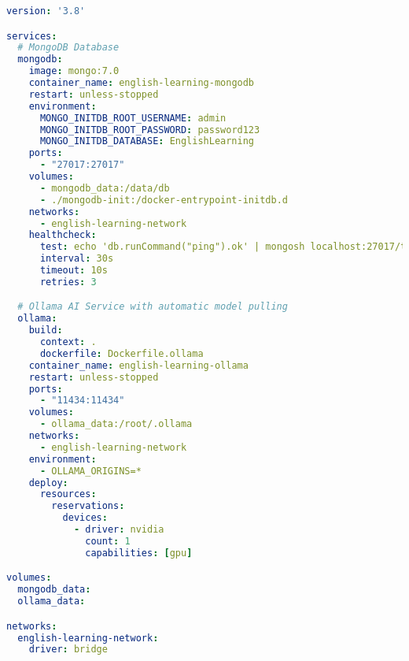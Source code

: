 \documentclass[12pt,a4paper]{article}
\begin{document}
\begin{lstlisting}[language=yaml, style=mystyle, caption=Configurazione Docker Compose - Orchestrazione Servizi, label=lst:dockercompose]
version: '3.8'

services:
  # MongoDB Database
  mongodb:
    image: mongo:7.0
    container_name: english-learning-mongodb
    restart: unless-stopped
    environment:
      MONGO_INITDB_ROOT_USERNAME: admin
      MONGO_INITDB_ROOT_PASSWORD: password123
      MONGO_INITDB_DATABASE: EnglishLearning
    ports:
      - "27017:27017"
    volumes:
      - mongodb_data:/data/db
      - ./mongodb-init:/docker-entrypoint-initdb.d
    networks:
      - english-learning-network
    healthcheck:
      test: echo 'db.runCommand("ping").ok' | mongosh localhost:27017/test --quiet
      interval: 30s
      timeout: 10s
      retries: 3

  # Ollama AI Service with automatic model pulling
  ollama:
    build:
      context: .
      dockerfile: Dockerfile.ollama
    container_name: english-learning-ollama
    restart: unless-stopped
    ports:
      - "11434:11434"
    volumes:
      - ollama_data:/root/.ollama
    networks:
      - english-learning-network
    environment:
      - OLLAMA_ORIGINS=*
    deploy:
      resources:
        reservations:
          devices:
            - driver: nvidia
              count: 1
              capabilities: [gpu]

volumes:
  mongodb_data:
  ollama_data:

networks:
  english-learning-network:
    driver: bridge
\end{lstlisting}
\end{document}
